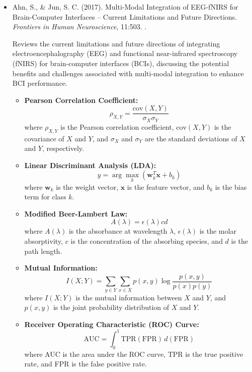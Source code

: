 \documentclass[10pt,svgnames,fragile]{beamer}
\begin{document}
\begin{frame}
\tiny
\begin{itemize}
    
    \item Ahn, S., & Jun, S. C. (2017). Multi-Modal Integration of EEG-fNIRS for Brain-Computer Interfaces – Current Limitations and Future Directions. \textit{Frontiers in Human Neuroscience}, 11:503. \href{https://doi.org/10.3389/fnhum.2017.00503}{\color{blue}{DOI: 10.3389/fnhum.2017.00503}}. \cite{ahnMultiModalIntegrationEEGfNIRS2017}

    {\color{gray}Reviews the current limitations and future directions of integrating electroencephalography (EEG) and functional near-infrared spectroscopy (fNIRS) for brain-computer interfaces (BCIs), discussing the potential benefits and challenges associated with multi-modal integration to enhance BCI performance.}
    \begin{itemize} \tiny
    \item \textbf{Pearson Correlation Coefficient:}
    \[
    \rho_{X,Y} = \frac{\text{cov}(X, Y)}{\sigma_X \sigma_Y}
    \]
    where \( \rho_{X,Y} \) is the Pearson correlation coefficient, \( \text{cov}(X, Y) \) is the covariance of \( X \) and \( Y \), and \( \sigma_X \) and \( \sigma_Y \) are the standard deviations of \( X \) and \( Y \), respectively.

    \item \textbf{Linear Discriminant Analysis (LDA):}
    \[
    y = \arg\max_k \left( \mathbf{w}_k^T \mathbf{x} + b_k \right)
    \]
    where \( \mathbf{w}_k \) is the weight vector, \( \mathbf{x} \) is the feature vector, and \( b_k \) is the bias term for class \( k \).

    \item \textbf{Modified Beer-Lambert Law:}
    \[
    A(\lambda) = \epsilon(\lambda) c d
    \]
    where \( A(\lambda) \) is the absorbance at wavelength \( \lambda \), \( \epsilon(\lambda) \) is the molar absorptivity, \( c \) is the concentration of the absorbing species, and \( d \) is the path length.

    \item \textbf{Mutual Information:}
    \[
    I(X;Y) = \sum_{y \in Y} \sum_{x \in X} p(x, y) \log \frac{p(x, y)}{p(x)p(y)}
    \]
    where \( I(X; Y) \) is the mutual information between \( X \) and \( Y \), and \( p(x, y) \) is the joint probability distribution of \( X \) and \( Y \).
    
    \item \textbf{Receiver Operating Characteristic (ROC) Curve:}
    \[
    \text{AUC} = \int_{0}^{1} \text{TPR}(\text{FPR}) \, d(\text{FPR})
    \]
    where AUC is the area under the ROC curve, TPR is the true positive rate, and FPR is the false positive rate.
\end{itemize}
    

\end{itemize}
\end{frame}
\end{document}
